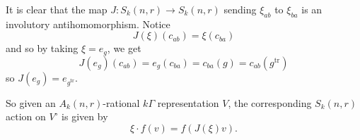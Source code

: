 \documentclass[12pt]{article}
\DeclareMathOperator{\1}{\mathbbm{1}}
\begin{document}
It is clear that the map $J:S_k(n,r)\to S_k(n,r)$ sending $\xi_{ab}$ to $\xi_{ba}$ is an involutory antihomomorphism.
Notice 
\[J(\xi)(c_{ab})=\xi(c_{ba})\]
and so by taking $\xi=e_g$, we get 
\[J(e_g)(c_{ab})=e_g(c_{ba})=c_{ba}(g)=c_{ab}(g^{\text{tr}})\]
so $J(e_g)=e_{g^{\text{tr}}}$.

So given an $A_k(n,r)$-rational $k\Gamma$ representation $V$, the corresponding $S_k(n,r)$ action on $V^\circ$ is given by 
\[\xi\cdot f (v)=f(J(\xi)v). \]


\medskip

\printbibliography
\end{document}
